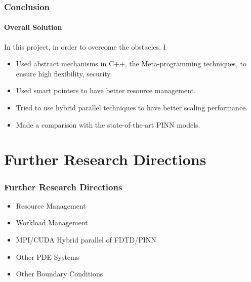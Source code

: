 \begin{frame}
  \frametitle{Conclusion}
  \framesubtitle{Overall Solution}
  In this project, in order to overcome the obstacles, I 
  \begin{itemize}
    \item Used abstract mechanisms in C++, the Meta-programming techniques, to ensure high flexibility, security.
    \item Used smart pointers to have better resource management.
    \item Tried to use hybrid parallel techniques to have better scaling performance.
    \item Made a comparison with the state-of-the-art PINN models.
  \end{itemize}
  

\end{frame}

\section{Further Research Directions}
\begin{frame}
  \frametitle{Further Research Directions}
  \begin{itemize}
    \item Resource Management
    \item Workload Management
    \item MPI/CUDA Hybrid parallel of FDTD/PINN
    \item Other PDE Systems
    \item Other Boundary Conditions
  \end{itemize}
\end{frame}